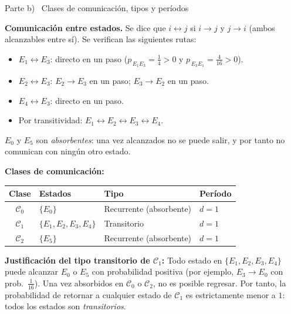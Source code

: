 \documentclass[10pt,a4paper]{article}
\newcommand{\pij}[2]{p_{\,#1#2}}
\newcommand{\parteheader}[1]{%
  \vspace{8pt}\needspace{4cm}\noindent
  \begin{tcolorbox}[
    colback=subsecbg!18, colframe=subsecbg!55,
    sharp corners, boxrule=0.4pt,
    left=6pt, right=6pt, top=3pt, bottom=3pt,
    fontupper=\small\bfseries\sffamily,
  ]
  #1
  \end{tcolorbox}\vspace{2pt}%
}
\begin{document}
\parteheader{Parte b) \textperiodcentered\ Clases de comunicaci\'on, tipos y per\'iodos}

\textbf{Comunicaci\'on entre estados.}\quad
Se dice que $i \leftrightarrow j$ si $i \to j$ y $j \to i$ (ambos alcanzables entre
s\'i). Se verifican las siguientes rutas:

\begin{itemize}
  \item $E_1 \leftrightarrow E_3$: directo en un paso ($\pij{E_1}{E_3}=\tfrac{1}{4}>0$
        y $\pij{E_3}{E_1}=\tfrac{4}{16}>0$).
  \item $E_2 \leftrightarrow E_3$: $E_2\to E_3$ en un paso; $E_3\to E_2$ en un paso.
  \item $E_4 \leftrightarrow E_3$: directo en un paso.
  \item Por transitividad: $E_1\leftrightarrow E_2\leftrightarrow E_3\leftrightarrow E_4$.
\end{itemize}

$E_0$ y $E_5$ son \emph{absorbentes}: una vez alcanzados no se puede salir, y por
tanto no comunican con ning\'un otro estado.

\medskip
\textbf{Clases de comunicaci\'on:}

\begin{center}
  \begin{tabular}{clll}
    \toprule
    Clase           & Estados                  & Tipo                    & Per\'iodo \\
    \midrule
    $\mathcal{C}_0$ & $\{E_0\}$                & Recurrente (absorbente) & $d = 1$   \\
    $\mathcal{C}_1$ & $\{E_1, E_2, E_3, E_4\}$ & Transitorio             & $d = 1$   \\
    $\mathcal{C}_2$ & $\{E_5\}$                & Recurrente (absorbente) & $d = 1$   \\
    \bottomrule
  \end{tabular}
\end{center}

\textbf{Justificaci\'on del tipo transitorio de $\mathcal{C}_1$:}\quad
Todo estado en $\{E_1,E_2,E_3,E_4\}$ puede alcanzar $E_0$ o $E_5$ con probabilidad
positiva (por ejemplo, $E_3\to E_0$ con prob.\ $\tfrac{1}{16}$). Una vez absorbidos
en $\mathcal{C}_0$ o $\mathcal{C}_2$, no es posible regresar. Por tanto, la
probabilidad de retornar a cualquier estado de $\mathcal{C}_1$ es estrictamente
menor a $1$: todos los estados son \emph{transitorios}.
\end{document}
